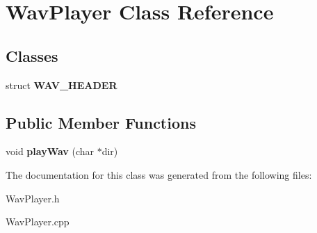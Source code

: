 \hypertarget{classWavPlayer}{\section{\-Wav\-Player \-Class \-Reference}
\label{classWavPlayer}
}
\subsection*{\-Classes}
\begin{DoxyCompactItemize}
\item 
struct {\bfseries \-W\-A\-V\-\_\-\-H\-E\-A\-D\-E\-R}
\end{DoxyCompactItemize}
\subsection*{\-Public \-Member \-Functions}
\begin{DoxyCompactItemize}
\item 
\hypertarget{classWavPlayer_a9dc7d80f2c2403a97507f1f7b6ad11be}{void {\bfseries play\-Wav} (char $\ast$dir)}\label{classWavPlayer_a9dc7d80f2c2403a97507f1f7b6ad11be}

\end{DoxyCompactItemize}


\-The documentation for this class was generated from the following files\-:\begin{DoxyCompactItemize}
\item 
\-Wav\-Player.\-h\item 
\-Wav\-Player.\-cpp\end{DoxyCompactItemize}
